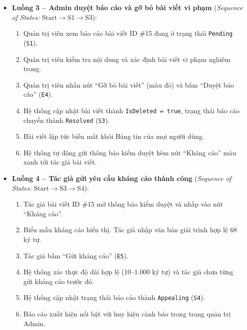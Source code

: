 \documentclass[11pt,a4paper]{article}
\begin{document}
\begin{itemize}[leftmargin=1.2cm, noitemsep]
    \item[\textbf{--}] \textbf{Luồng 3 -- Admin duyệt báo cáo và gỡ bỏ bài viết vi phạm} (\textit{Sequence of States:} $\text{Start} \rightarrow \text{S1} \rightarrow \text{S3}$):
    \begin{enumerate}[leftmargin=0.7cm, noitemsep]
        \item Quản trị viên xem báo cáo bài viết ID \#15 đang ở trạng thái \texttt{Pending} (\texttt{S1}).
        \item Quản trị viên kiểm tra nội dung và xác định bài viết vi phạm nghiêm trọng.
        \item Quản trị viên nhấn nút ``Gỡ bỏ bài viết'' (màu đỏ) và bấm ``Duyệt báo cáo'' (\texttt{E4}).
        \item Hệ thống cập nhật bài viết thành \texttt{IsDeleted = true}, trạng thái báo cáo chuyển thành \texttt{Resolved} (\texttt{S3}).
        \item Bài viết lập tức biến mất khỏi Bảng tin của mọi người dùng.
        \item Hệ thống tự động gửi thông báo kiểm duyệt kèm nút ``Kháng cáo'' màu xanh tới tác giả bài viết.
    \end{enumerate}

    \item[\textbf{--}] \textbf{Luồng 4 -- Tác giả gửi yêu cầu kháng cáo thành công} (\textit{Sequence of States:} $\text{Start} \rightarrow \text{S3} \rightarrow \text{S4}$):
    \begin{enumerate}[leftmargin=0.7cm, noitemsep]
        \item Tác giả bài viết ID \#15 mở thông báo kiểm duyệt và nhấp vào nút ``Kháng cáo''.
        \item Biểu mẫu kháng cáo hiển thị. Tác giả nhập văn bản giải trình hợp lệ 68 ký tự.
        \item Tác giả bấm ``Gửi kháng cáo'' (\texttt{E5}).
        \item Hệ thống xác thực độ dài hợp lệ (10--1.000 ký tự) và tác giả chưa từng gửi kháng cáo trước đó.
        \item Hệ thống cập nhật trạng thái báo cáo thành \texttt{Appealing} (\texttt{S4}).
        \item Báo cáo xuất hiện nổi bật với huy hiệu cảnh báo trong trang quản trị Admin.
    \end{enumerate}


\end{itemize}
\end{document}
